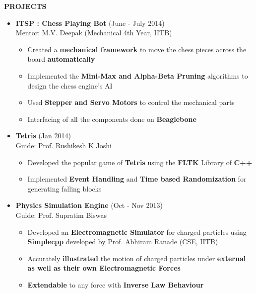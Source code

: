 \documentclass[a4paper,10pt]{article}
\newcommand{\resheading}[1]{{\small \colorbox{mygrey}{\begin{minipage}{0.975\textwidth}{\textbf{#1 \vphantom{p\^{E}}}}\end{minipage}}}}
\begin{document}
\resheading{\textbf{PROJECTS}}
\begin{itemize}
 \itemsep 0em
 \item {\bf ITSP : Chess Playing Bot} \hfill {(June - July 2014)} \\
 \hspace*{5mm}   Mentor: M.V. Deepak (Mechanical 4th Year, IITB)
 \begin{itemize}
  \itemsep 0em
  \item Created a {\bf mechanical framework} to move the chess pieces across the board {\bf automatically}
  \item Implemented the {\bf Mini-Max and Alpha-Beta Pruning} algorithms to design the chess engine's AI
  \item Used {\bf Stepper and Servo Motors} to control the mechanical parts
  \item Interfacing of all the components done on {\bf Beaglebone }
 \end{itemize}
 
 \item {\bf Tetris} \hfill {(Jan 2014)} \\
 \hspace*{5mm}   Guide: Prof. Rushikesh K Joshi
 \begin{itemize}
  \itemsep 0em
  \item Developed the popular game of {\bf Tetris} using the {\bf FLTK} Library of {\bf C++}
  \item Implemented {\bf Event Handling} and {\bf Time based Randomization} for generating falling blocks 
 \end{itemize}
 
 \item {\bf Physics Simulation Engine} \hfill {(Oct - Nov 2013)} \\
 \hspace*{5mm}   Guide: Prof. Supratim Biswas
 \begin{itemize}
  \itemsep 0em
  \item Developed an {\bf Electromagnetic Simulator} for charged particles using {\bf Simplecpp} developed by Prof. Abhiram Ranade (CSE, IITB)
  \item Accurately {\bf illustrated} the motion of charged particles under {\bf external as well as their own Electromagnetic Forces}
  \item {\bf Extendable} to any force with {\bf Inverse Law Behaviour}
 \end{itemize}
\end{itemize}
\end{document}
